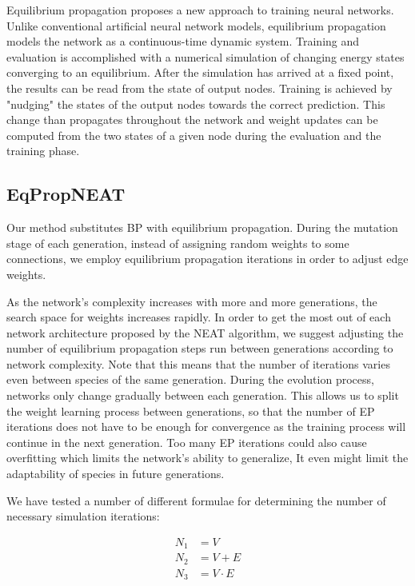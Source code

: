 \documentclass[lettersize,journal]{IEEEtran}
\newcommand{\eqprop}{EP }
\begin{document}
		Equilibrium propagation proposes a new approach to training neural networks. Unlike conventional artificial neural network models, equilibrium propagation models the network as a continuous-time dynamic system. Training and evaluation is accomplished with a numerical simulation of changing energy states converging to an equilibrium. After the simulation has arrived at a fixed point, the results can be read from the state of output nodes. Training is achieved by "nudging" the states of the output nodes towards the correct prediction. This change than propagates throughout the network and weight updates can be computed from the two states of a given node during the evaluation and the training phase.
		
		\subsection{EqPropNEAT}
		Our method substitutes BP with equilibrium propagation. During the mutation stage of each generation, instead of assigning random weights to some connections, we employ equilibrium propagation iterations in order to adjust edge weights.
		
		As the network's complexity increases with more and more generations, the search space for weights increases rapidly. In order to get the most out of each network architecture proposed by the NEAT algorithm, we suggest adjusting the number of equilibrium propagation steps run between generations according to network complexity. Note that this means that the number of iterations varies even between species of the same generation. During the evolution process, networks only change gradually between each generation. This allows us to split the weight learning process between generations, so that the number of \eqprop iterations does not have to be enough for convergence as the training process will continue in the next generation. Too many \eqprop iterations could also cause overfitting which limits the network's ability to generalize, It even might limit the adaptability of species in future generations. 
		
		We have tested a number of different formulae for determining the number of necessary simulation iterations:
		
		\begin{align}
			N_1 &= V\\
			N_2 &= V+E\\
			N_3 &= V\cdot E
		\end{align}
		
\end{document}

